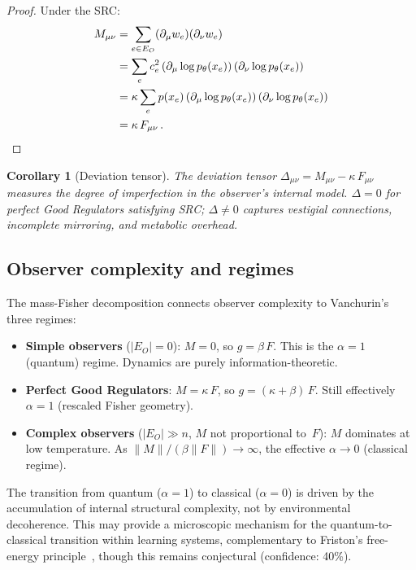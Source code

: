 \documentclass[11pt]{article}
\newtheorem{corollary}[theorem]{Corollary}
\theoremstyle{definition}
\theoremstyle{remark}
\begin{document}
\begin{proof}
Under the SRC:
\begin{align*}
M_{\mu\nu} &= \sum_{e \in E_O} (\partial_\mu w_e)(\partial_\nu w_e) \\
&= \sum_e c_e^2\, (\partial_\mu \log p_\theta(x_e))\,
   (\partial_\nu \log p_\theta(x_e)) \\
&= \kappa \sum_e p(x_e)\, (\partial_\mu \log p_\theta(x_e))\,
   (\partial_\nu \log p_\theta(x_e)) \\
&= \kappa\, F_{\mu\nu}\,. \qedhere
\end{align*}
\end{proof}

\begin{corollary}[Deviation tensor]
\label{cor:deviation}
The deviation tensor $\Delta_{\mu\nu} = M_{\mu\nu} - \kappa\,F_{\mu\nu}$
measures the degree of imperfection in the observer's internal model.
$\Delta = 0$ for perfect Good Regulators satisfying SRC;
$\Delta \neq 0$ captures vestigial connections, incomplete mirroring,
and metabolic overhead.
\end{corollary}

\subsection{Observer complexity and regimes}
\label{sec:observer-complexity}

The mass-Fisher decomposition connects observer complexity to
Vanchurin's three regimes:

\begin{itemize}
\item \textbf{Simple observers} ($|E_O| = 0$): $M = 0$, so $g = \beta\,F$.
  This is the $\alpha = 1$ (quantum) regime.
  Dynamics are purely information-theoretic.

\item \textbf{Perfect Good Regulators}: $M = \kappa\,F$, so
  $g = (\kappa + \beta)\,F$.  Still effectively $\alpha = 1$ (rescaled
  Fisher geometry).

\item \textbf{Complex observers} ($|E_O| \gg n$, $M$ not proportional
  to~$F$): $M$ dominates at low temperature.
  As $\|M\| / (\beta \|F\|) \to \infty$, the effective $\alpha \to 0$
  (classical regime).
\end{itemize}

The transition from quantum ($\alpha = 1$) to classical ($\alpha = 0$)
is driven by the accumulation of internal structural complexity, not by
environmental decoherence.
This may provide a microscopic mechanism for the quantum-to-classical
transition within learning systems, complementary to Friston's
free-energy principle~\cite{Friston2010}, though this remains conjectural
(confidence: 40\%).
\end{document}
